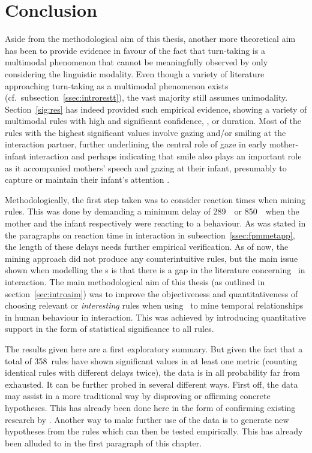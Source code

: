 
\chapter{Conclusion}
\label{ch:con}
Aside from the methodological aim of this thesis, another more theoretical aim has been to provide evidence in favour of the fact that turn-taking is a multimodal phenomenon that cannot be meaningfully observed by only considering the linguistic modality.
Even though a variety of literature approaching turn-taking as a multimodal phenomenon exists (cf.~subsection~\ref{ssec:introrestt}), the vast majority still assumes unimodality.
Section~\ref{sig:res} has indeed provided such empirical evidence, showing a variety of multimodal rules with high and significant confidence, \noc, or duration.
Most of the rules with the highest significant values involve gazing and/or smiling at the interaction partner, further underlining the central role of gaze in early mother-infant interaction and perhaps indicating that smile also plays an important role as it accompanied mothers' speech and gazing at their infant, presumably to capture or maintain their infant's attention \citep{nomikou_educating_2013,nomikou_constructing_2016}.

Methodologically, the first step taken was to consider reaction times when mining rules.
This was done by demanding a minimum delay of 289~\ms\ or 850~\ms\ when the mother and the infant respectively were reacting to a behaviour.
As was stated in the paragraphs on reaction time in interaction in subsection~\ref{ssec:fpmmetapp}, the length of these delays needs further empirical verification.
As of now, the mining approach did not produce any counterintuitive rules, but the main issue shown when modelling the \rt s is that there is a gap in the literature concerning \rt\ in interaction.
The main methodological aim of this thesis (as outlined in section~\ref{sec:introaim}) was to improve the objectiveness and quantitativeness of choosing relevant or \emph{interesting} rules when using \fpmlower\ to mine temporal relationships in human behaviour in interaction.
This was achieved by introducing quantitative support in the form of statistical significance to all rules.

The results given here are a first exploratory summary.
But given the fact that a total of 358~rules have shown significant values in at least one metric (counting identical rules with different delays twice), the data is in all probability far from exhausted.
It can be further probed in several different ways.
First off, the data may assist in a more traditional way by disproving or affirming concrete hypotheses.
This has already been done here in the form of confirming existing research by \citet{nomikou_educating_2013}.
Another way to make further use of the data is to generate new hypotheses from the rules which can then be tested empirically.
This has already been alluded to in the first paragraph of this chapter.

